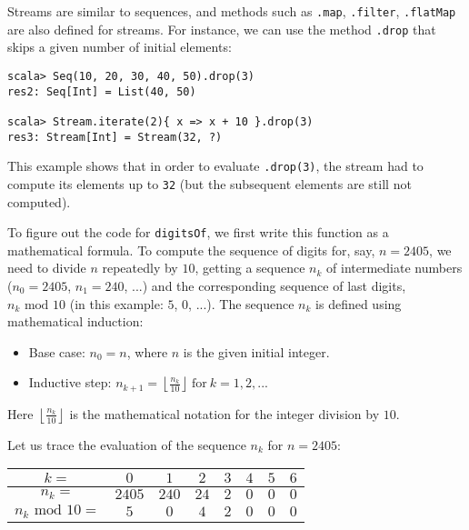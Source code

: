 Streams are similar to sequences, and methods such as \lstinline!.map!,
\lstinline!.filter!, \lstinline!.flatMap!
are also defined for streams. For instance, we can use the method
\lstinline!.drop! that
skips a given number of initial elements:
\begin{lstlisting}
scala> Seq(10, 20, 30, 40, 50).drop(3)
res2: Seq[Int] = List(40, 50)

scala> Stream.iterate(2){ x => x + 10 }.drop(3)
res3: Stream[Int] = Stream(32, ?)
\end{lstlisting}
This example shows that in order to evaluate \lstinline!.drop(3)!,
the stream had to compute its elements up to \lstinline!32!
(but the subsequent elements are still not computed).

To figure out the code for \lstinline!digitsOf!,
we first write this function as a mathematical formula. To compute
the sequence of digits for, say, $n=2405$, we need to divide $n$
repeatedly by $10$, getting a sequence $n_{k}$ of intermediate numbers
($n_{0}=2405$, $n_{1}=240$, ...) and the corresponding sequence
of last digits, $n_{k}\text{ mod }10$ (in this example: $5$, $0$,
...). The sequence $n_{k}$ is defined using mathematical induction:
\begin{itemize}
\item Base case: $n_{0}=n$, where $n$ is the given initial integer.
\item Inductive step: $n_{k+1}=\left\lfloor \frac{n_{k}}{10}\right\rfloor \ \text{for}\ k=1,2,...$
\end{itemize}
Here $\left\lfloor \frac{n_{k}}{10}\right\rfloor $ is the mathematical
notation for the integer division by $10$. 

Let us trace the evaluation of the sequence $n_{k}$ for $n=2405$:
\begin{center}
\begin{tabular}{|c|c|c|c|c|c|c|c|}
\hline 
$k=$ & $0$ & $1$ & $2$ & $3$ & $4$ & $5$ & $6$\tabularnewline
\hline 
$n_{k}=$ & $2405$ & $240$ & $24$ & $2$ & $0$ & $0$ & $0$\tabularnewline
\hline 
$n_{k}\text{ mod }10=$ & $5$ & $0$ & $4$ & $2$ & $0$ & $0$ & $0$\tabularnewline
\hline 
\end{tabular}
\par\end{center}

